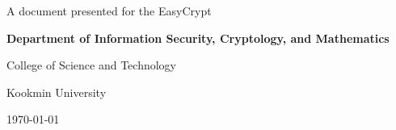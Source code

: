 \begin{titlepage}
	\vspace{1.5cm}
    \vfill
    A document presented for the EasyCrypt
    
    \vspace{0.8cm}
    {\bf\large\textsf{Department of Information Security, Cryptology, and Mathematics}\par}
    {\large\textsf{College of Science and Technology}\par}
    {\large\textsf{Kookmin University}\par}
    \vspace{.25in}
    {\large \textsf{\today}\par}
    
\end{titlepage}

